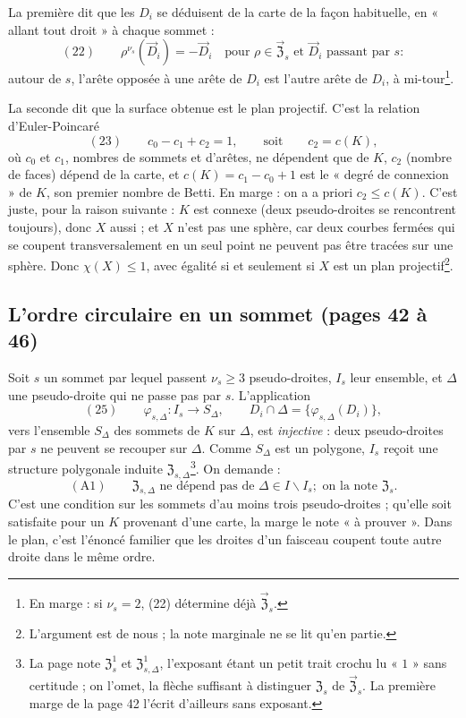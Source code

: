 \documentclass[11pt,a4paper]{article}
\begin{document}
La première dit que les $D_i$ se déduisent de la carte de la façon
habituelle, en « allant tout droit » à chaque sommet :
\[
(22) \qquad \rho^{\nu_s}(\vec{D}_i) = -\vec{D}_i \quad \text{pour } \rho \in
\vec{\mathfrak{Z}}_s \text{ et } \vec{D}_i \text{ passant par } s :
\]
autour de $s$, l'arête opposée à une arête de $D_i$ est l'autre arête de
$D_i$, à mi-tour\footnote{En marge : si $\nu_s = 2$, (22) détermine déjà
$\vec{\mathfrak{Z}}_s$.}.

La seconde dit que la surface obtenue est le plan projectif. C'est la
relation d'Euler-Poincaré
\[
(23) \qquad c_0 - c_1 + c_2 = 1, \qquad \text{soit} \qquad c_2 = c(K),
\]
où $c_0$ et $c_1$, nombres de sommets et d'arêtes, ne dépendent que de $K$,
$c_2$ (nombre de faces) dépend de la carte, et $c(K) = c_1 - c_0 + 1$ est
le « degré de connexion » de $K$, son premier nombre de Betti. En marge :
on a a priori $c_2 \leqslant c(K)$. C'est juste, pour la raison suivante :
$K$ est connexe (deux pseudo-droites se rencontrent toujours), donc $X$
aussi ; et $X$ n'est pas une sphère, car deux courbes fermées qui se
coupent transversalement en un seul point ne peuvent pas être tracées sur une
sphère. Donc $\chi(X) \leqslant 1$, avec égalité si et seulement si $X$ est
un plan projectif\footnote{L'argument est de nous ; la note marginale ne se
lit qu'en partie.}.

\subsection*{L'ordre circulaire en un sommet (pages 42 à 46)}

Soit $s$ un sommet par lequel passent $\nu_s \geqslant 3$ pseudo-droites,
$I_s$ leur ensemble, et $\Delta$ une pseudo-droite qui ne passe pas par $s$.
L'application
\[
(25) \qquad \varphi_{s,\Delta} : I_s \longrightarrow S_\Delta, \qquad D_i \cap
\Delta = \{\varphi_{s,\Delta}(D_i)\},
\]
vers l'ensemble $S_\Delta$ des sommets de $K$ sur $\Delta$, est
\emph{injective} : deux pseudo-droites par $s$ ne peuvent se recouper sur
$\Delta$. Comme $S_\Delta$ est un polygone, $I_s$ reçoit une structure
polygonale induite $\mathfrak{Z}_{s,\Delta}$\footnote{La page note
$\mathfrak{Z}^{1}_s$ et $\mathfrak{Z}^{1}_{s,\Delta}$, l'exposant étant un petit
trait crochu lu « $1$ » sans certitude ; on l'omet, la flèche suffisant à
distinguer $\mathfrak{Z}_s$ de $\vec{\mathfrak{Z}}_s$. La première marge de la
page 42 l'écrit d'ailleurs sans exposant.}. On demande :
\[
(\mathrm{A}1) \qquad \mathfrak{Z}_{s,\Delta} \text{ ne dépend pas de } \Delta
\in I \smallsetminus I_s ; \text{ on la note } \mathfrak{Z}_s .
\]
C'est une condition sur les sommets d'au moins trois pseudo-droites ;
qu'elle soit satisfaite pour un $K$ provenant d'une carte, la marge le note
« à prouver ». Dans le plan, c'est l'énoncé familier que les droites d'un
faisceau coupent toute autre droite dans le même ordre.
\end{document}
